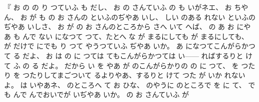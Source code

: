 『
お
の
の
り
つていふ
も
だし、%
お
の
さんていふ
の
も
いがネエ、
お
ちやん、
お
が
も
の
お
さんの
といふのぢやあ
いし、
しい
のある
れない
といふのぢやあ
いしさ、
お
が
の
お
さんのところから
さへ
いて
へば、
の
あ
お
にやあ
も
んで
ない
になつて
つて、たとへ
な
が
まるにしても
が
まるにしても、
が
だけで
にでも
り
つて
やうつていふ
ぢやあ
いか。
あ
になつてこんがらかつて
る
だよ、
お
は
の
に
つては
てもこんがらかつては
い{---}{---}
ればするりと
けて
ふ
の
る
だよ。
だから
い
を
やあ
が
のこんがらかりの
の
に
つて、
を
つたり
を
つたりしてまごついて
るよりやあ、するりと
けて
つた
が
いか
れないよ。
は
いやあネ、
のところへ
て
お
ひな、
のやうに
のところで
を
に
て、
でも
んで
んでおいでが
いぢやあ
いか。
の
お
さんていふ
が
